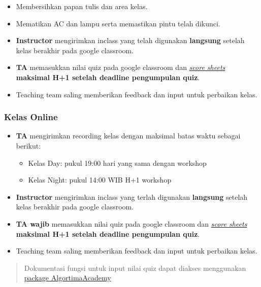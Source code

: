 \documentclass[
]{book}
\providecommand{\tightlist}{%
  \setlength{\itemsep}{0pt}\setlength{\parskip}{0pt}}
\begin{document}
\begin{itemize}
\tightlist
\item
  Membersihkan papan tulis dan area kelas.
\item
  Mematikan AC dan lampu serta memastikan pintu telah dikunci.
\item
  \textbf{Instructor} mengirimkan inclass yang telah digunakan \textbf{langsung} setelah kelas berakhir pada google classroom.
\item
  \textbf{TA} memasukkan nilai quiz pada google classroom dan \href{https://docs.google.com/spreadsheets/d/1cGJ0pn9k9gKCBnceWVwaL9D7BBDMNjLh8uPYlaBlJi8/edit?usp=sharing}{\emph{score sheets}} \textbf{maksimal H+1 setelah deadline pengumpulan quiz}.
\item
  Teaching team saling memberikan feedback dan input untuk perbaikan kelas.
\end{itemize}

\hypertarget{kelas-online-2}{%
\subsubsection{Kelas Online}\label{kelas-online-2}}

\begin{itemize}
\tightlist
\item
  \textbf{TA} mengirimkan recording kelas dengan maksimal batas waktu sebagai berikut:

  \begin{itemize}
  \tightlist
  \item
    Kelas Day: pukul 19:00 hari yang sama dengan workshop
  \item
    Kelas Night: pukul 14:00 WIB H+1 workshop
  \end{itemize}
\item
  \textbf{Instructor} mengirimkan inclass yang terlah digunakan \textbf{langsung} setelah kelas berakhir pada google classroom.
\item
  \textbf{TA wajib} memasukkan nilai quiz pada google classroom dan \href{https://docs.google.com/spreadsheets/d/1cGJ0pn9k9gKCBnceWVwaL9D7BBDMNjLh8uPYlaBlJi8/edit?usp=sharing}{\emph{score sheets}} \textbf{maksimal H+1 setelah deadline pengumpulan quiz}.
\item
  Teaching team saling memberikan feedback dan input untuk perbaikan kelas.
\end{itemize}

\begin{quote}
Dokumentasi fungsi untuk input nilai quiz dapat diakses menggunakan \href{https://github.com/Davidlimbong/AlgoritmaAcademy}{package AlgortimaAcademy}
\end{quote}
\end{document}
